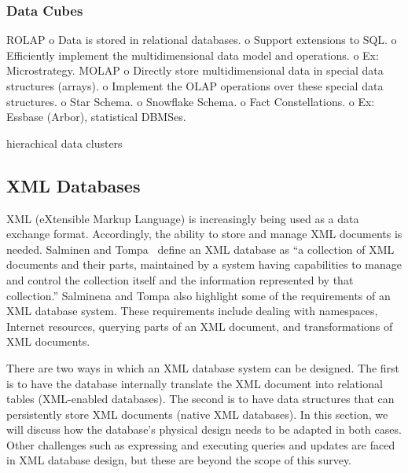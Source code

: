 \documentclass[12pt,a4paper]{article}
\begin{document}
\subsubsection*{Data Cubes}
\cite{Cheung20011}
ROLAP
          o Data is stored in relational databases.
          o Support extensions to SQL.
          o Efficiently implement the multidimensional data model and operations.
          o Ex: Microstrategy.
MOLAP
          o Directly store multidimensional data in special data structures (arrays).
          o Implement the OLAP operations over these special data structures.
          o Star Schema.
          o Snowflake Schema. \cite{kimball2009data}
          o Fact Constellations.
          o Ex: Essbase (Arbor), statistical DBMSes.

hierachical data clusters \cite{karayannidis2008hierarchical}

\subsection{XML Databases}
\label{SEC-XML}

XML (eXtensible Markup Language) is increasingly being used as a data exchange format. Accordingly, the ability to store and manage XML documents is needed. Salminen and Tompa~\cite{salminen2001requirements} define an XML database as ``a collection of XML documents
and their parts, maintained by a system having capabilities to
manage and control the collection itself and the information
represented by that collection.'' Salminena and Tompa also highlight some of the requirements of an XML database system. These requirements include dealing with namespaces, Internet resources, querying parts of an XML document, and transformations of XML documents.

There are two ways in which an XML database system can be designed. The first is to have the database internally translate the XML document into relational tables (XML-enabled databases). The second is to have data structures that can persistently store XML documents (native XML databases). In this section, we will discuss how the database's physical design needs to be adapted in both cases. Other challenges such as expressing and executing queries and updates are faced in XML database design, but these are beyond the scope of this survey.

\end{document}
